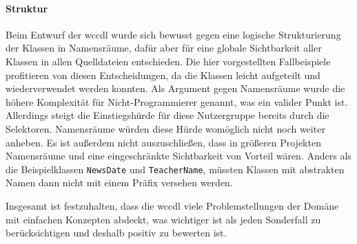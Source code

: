     \paragraph{Struktur}
    Beim Entwurf der \gls{wccdl} wurde sich bewusst gegen
    eine logische Strukturierung der Klassen in Namensräume,
    dafür aber für eine globale Sichtbarkeit aller Klassen
    in allen Quelldateien entschieden.
    Die hier vorgestellten Fallbeispiele profitieren von diesen Entscheidungen,
    da die Klassen leicht aufgeteilt und wiederverwendet werden konnten.
    Als Argument gegen Namensräume wurde die höhere Komplexität für
    Nicht-Programmierer genannt, was ein valider Punkt ist.
    Allerdings steigt die Einstiegshürde für diese Nutzergruppe bereits
    durch die Selektoren. Namensräume würden diese Hürde womöglich nicht noch weiter anheben.
    Es ist außerdem nicht auszuschließen, dass in größeren Projekten
    Namensräume und eine eingeschränkte Sichtbarkeit von Vorteil wären.
    Anders als die Beispielklassen \texttt{NewsDate} und \texttt{TeacherName},
    müssten Klassen mit abstrakten Namen dann nicht mit einem Präfix versehen werden.

    Insgesamt ist festzuhalten, dass die \gls{wccdl} viele Problemstellungen der Domäne
    mit einfachen Konzepten abdeckt, was wichtiger ist als jeden Sonderfall zu berücksichtigen
    und deshalb positiv zu bewerten ist.